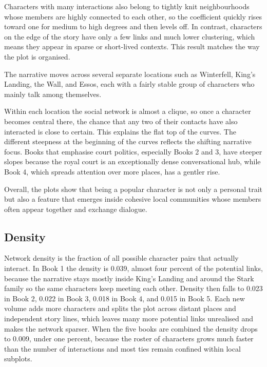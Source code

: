 \documentclass[12pt, a4paper]{article}
\begin{document}
Characters with many interactions also belong to tightly knit neighbourhoods whose members
 are highly connected to each other, so the coefficient quickly rises toward one for medium
 to high degrees and then levels off. In contrast, characters on the edge of the story 
 have only a few links and much lower clustering, which means they appear in sparse or 
 short-lived contexts. This result matches the way the plot is organised. 
 
 The narrative moves across several separate locations such as Winterfell, King's Landing, 
 the Wall, and Essos, each with a fairly stable group of characters who mainly talk among 
 themselves.
 
 Within each location the social network is almost a clique, 
 so once a character becomes central there, the chance that any 
 two of their contacts have also interacted is close to certain. 
 This explains the flat top of the curves.
   The different steepness at the beginning of the curves reflects the shifting narrative focus.
   Books that emphasise court politics, especially Books 2 and 3, 
   have steeper slopes because the royal court is an exceptionally 
   dense conversational hub, while Book 4, which spreads attention over more places, 
   has a gentler rise. 
   
   Overall, the plots show that being a popular character is not only a personal trait but also a feature that emerges inside cohesive local communities whose members often appear together and exchange dialogue.

\subsection*{Density}
Network density is the fraction of all possible character pairs that actually interact. In Book 1 the density is 0.039, almost four percent of the potential links, because the narrative stays mostly inside King's Landing and around the Stark family so the same characters keep meeting each other. Density then falls to 0.023 in Book 2, 0.022 in Book 3, 0.018 in Book 4, and 0.015 in Book 5. Each new volume adds more characters and splits the plot across distant places and independent story lines, which leaves many more potential links unrealised and makes the network sparser. When the five books are combined the density drops to 0.009, under one percent, because the roster of characters grows much faster than the number of interactions and most ties remain confined within local subplots.
\end{document}
